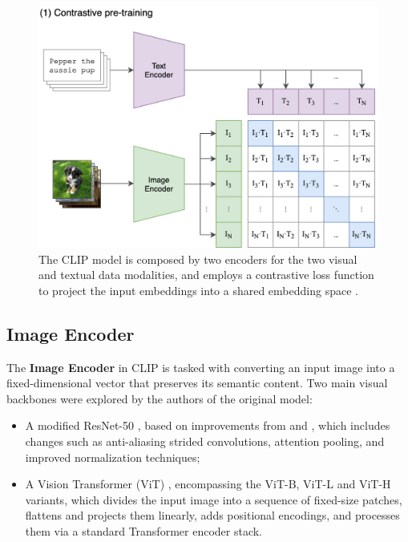 \documentclass[a4paper, oneside, english]{sapthesis} %
\begin{document}
\begin{figure}[h]
    \centering
    \includegraphics[width=\textwidth]{img/CLIP-structure.png}
    \caption{The CLIP model is composed by two encoders for the two visual and textual data modalities, and employs a contrastive loss function to project the input embeddings into a shared embedding space \cite{radford2021learning}.}
    \label{fig:clip}
\end{figure}


\subsection{Image Encoder}

The \textbf{Image Encoder} in CLIP is tasked with converting an input image into a fixed-dimensional vector that preserves its semantic content. Two main visual backbones were explored by the authors of the original model:

\begin{itemize}
    \item A modified ResNet-50 \cite{he2016deep}, based on improvements from \cite{he2019bag} and \cite{zhang2019making}, which includes changes such as anti-aliasing strided convolutions, attention pooling, and improved normalization techniques;
    \item A Vision Transformer (ViT) \cite{dosovitskiy2020image}, encompassing the ViT-B, ViT-L and ViT-H variants, which divides the input image into a sequence of fixed-size patches, flattens and projects them linearly, adds positional encodings, and processes them via a standard Transformer encoder stack.
\end{itemize}
\end{document}
